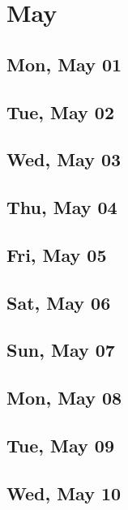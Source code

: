 \chapter{May}
	\section{Mon, May 01}
		
	\section{Tue, May 02}
		
	\section{Wed, May 03}
		
	\section{Thu, May 04}
		
	\section{Fri, May 05}
		
	\section{Sat, May 06}
		
	\section{Sun, May 07}
		
	\section{Mon, May 08}
		
	\section{Tue, May 09}
		
	\section{Wed, May 10}
		
